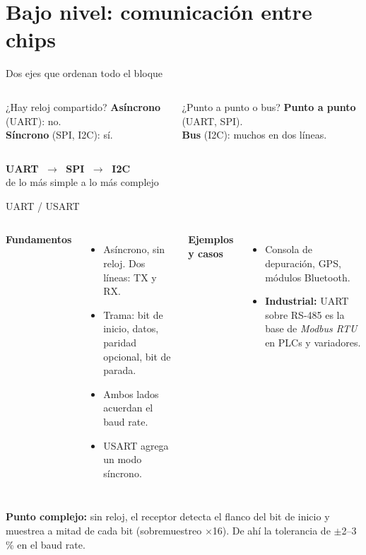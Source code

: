 \documentclass[aspectratio=169,11pt]{beamer}
\newcommand{\complejo}[1]{{\color{cobre}\textbf{Punto complejo:}} #1}
\begin{document}
\section{Bajo nivel: comunicación entre chips}

\begin{frame}{Dos ejes que ordenan todo el bloque}
\begin{columns}[T]
\begin{block}{¿Hay reloj compartido?}
\textbf{Asíncrono} (UART): no. \\
\textbf{Síncrono} (SPI, I2C): sí.
\end{block}
\begin{block}{¿Punto a punto o bus?}
\textbf{Punto a punto} (UART, SPI). \\
\textbf{Bus} (I2C): muchos en dos líneas.
\end{block}
\end{columns}
\vspace{0.8em}
\begin{center}
{\color{cobre}\textbf{UART}} $\;\longrightarrow\;$ {\color{cobre}\textbf{SPI}} $\;\longrightarrow\;$ {\color{cobre}\textbf{I2C}} \\[0.3em]
{\footnotesize de lo más simple a lo más complejo}
\end{center}
\end{frame}

\begin{frame}{UART / USART}
\begin{columns}[T]
\textbf{Fundamentos}
\begin{itemize}\small
  \item Asíncrono, sin reloj. Dos líneas: TX y RX.
  \item Trama: bit de inicio, datos, paridad opcional, bit de parada.
  \item Ambos lados acuerdan el \alert{baud rate}.
  \item USART agrega un modo síncrono.
\end{itemize}
\textbf{Ejemplos y casos}
\begin{itemize}\small
  \item Consola de depuración, GPS, módulos Bluetooth.
  \item \textbf{Industrial:} UART sobre RS-485 es la base de \emph{Modbus RTU} en PLCs y variadores.
\end{itemize}
\end{columns}
\vspace{0.4em}
\complejo{sin reloj, el receptor detecta el flanco del bit de inicio y muestrea a mitad de cada bit (sobremuestreo $\times$16). De ahí la tolerancia de $\pm$2--3\,\% en el baud rate.}
\end{frame}
\end{document}
